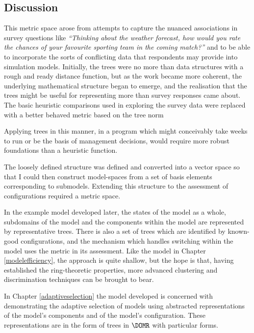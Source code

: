 \begin{definition}
\section{Discussion}

This metric space arose from attempts to capture the nuanced
associations in survey questions like \textsl{``Thinking about the
  weather forecast, how would you rate the chances of your favourite
  sporting team in the coming match?''\/} and to be able to incorporate
the sorts of conflicting data that respondents may provide into
simulation models. Initially, the trees were no more than data
structures with a rough and ready distance function, but as the
work became more coherent, the underlying mathematical structure began
to emerge, and the realisation that the trees might be useful for
representing more than survey responses came about. The basic
heuristic comparisons used in exploring the survey data were replaced
with a better behaved metric based on the tree norm

Applying trees in this manner, in a program which might conceivably
take weeks to run or be the basis of management decisions, would
require more robust foundations than a heuristic function.

The loosely defined structure was defined and converted into a vector
space so that I could then construct model-spaces from a set of basis
elements corresponding to submodels. Extending this structure to the
assessment of configurations required a metric space.

In the example model developed later, the states of the model as a
whole, subdomains of the model and the components within the model are
represented by representative trees.  There is also a set of trees
which are identified by known-good configurations, and the
mechanism which handles switching within the model uses the metric in
its assessment.  Like the model in Chapter \ref{modelefficiency}, the
approach is quite shallow, but the hope is that, having established
the ring-theoretic properties, more advanced clustering and
discrimination techniques can be brought to bear.

In Chapter \ref{adaptiveselection} the model developed is concerned with
demonstrating the adaptive selection of models using abstracted
representations of the model's components and of the model's
configuration. These representations are in the form of trees in
$\DOMR$ with particular forms.





\end{definition}
